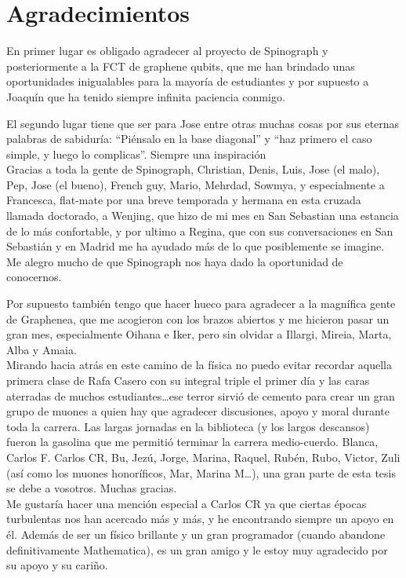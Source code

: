 \chapter*{Agradecimientos}
En primer lugar es obligado agradecer al proyecto de Spinograph y posteriormente a la FCT de graphene qubits, que me han brindado unas oportunidades inigualables para la mayoría de estudiantes y por supuesto a Joaquín que ha tenido siempre infinita paciencia conmigo.


El segundo lugar tiene que ser para Jose entre otras muchas cosas por sus eternas palabras de sabiduría: ``Piénsalo en la base diagonal'' y ``haz primero el caso simple, y luego lo complicas''. Siempre una inspiración\\

Gracias a toda la gente de Spinograph, Christian, Denis, Luis, Jose (el malo), Pep, Jose (el bueno), French guy, Mario, Mehrdad, Sowmya, y especialmente a Francesca, flat-mate por una breve temporada y hermana en esta cruzada llamada doctorado, a Wenjing, que hizo de mi mes en San Sebastian una estancia de lo más confortable, y por ultimo a Regina, que con sus conversaciones en San Sebastián y en Madrid me ha ayudado más de lo que posiblemente se imagine. Me alegro mucho de que Spinograph nos haya dado la oportunidad de conocernos.

Por supuesto también tengo que hacer hueco para agradecer a la magnífica gente de Graphenea, que me acogieron con los brazos abiertos y me hicieron pasar un gran mes, especialmente Oihana e Iker, pero sin olvidar a Illargi, Mireia, Marta, Alba y Amaia.\\


Mirando hacia atrás en este camino de la física no puedo evitar recordar aquella primera clase de Rafa Casero con su integral triple el primer día y las caras aterradas de muchos estudiantes\dots ese terror sirvió de cemento para crear un gran grupo de muones a quien hay que agradecer discusiones, apoyo y moral durante toda la carrera.
Las largas jornadas en la biblioteca (y los largos descansos) fueron la gasolina que me permitió terminar la carrera medio-cuerdo. Blanca, Carlos F. Carlos CR, Bu, Jezú, Jorge, Marina, Raquel, Rubén, Rubo, Victor, Zuli (así como los muones honoríficos, Mar, Marina M\dots), una gran parte de esta tesis se debe a vosotros. Muchas gracias.\\

Me gustaría hacer una mención especial a Carlos CR ya que ciertas épocas turbulentas nos han acercado más y más, y he encontrando siempre un apoyo en él. Además de ser un físico brillante y un gran programador (cuando abandone definitivamente Mathematica), es un gran amigo y le estoy muy agradecido por su apoyo y su cariño.\\

